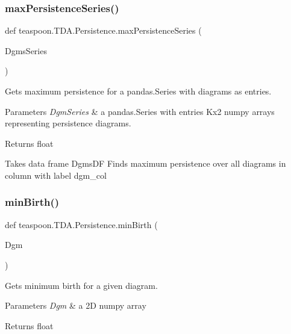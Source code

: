 \subsubsection{\texorpdfstring{max\+Persistence\+Series()}{maxPersistenceSeries()}}
{\footnotesize\ttfamily def teaspoon.\+T\+D\+A.\+Persistence.\+max\+Persistence\+Series (\begin{DoxyParamCaption}\item[{}]{Dgms\+Series }\end{DoxyParamCaption})}



Gets maximum persistence for a pandas.\+Series with diagrams as entries.


\begin{DoxyParams}{Parameters}
{\em Dgm\+Series} & a pandas.\+Series with entries Kx2 numpy arrays representing persistence diagrams.\\
\hline
\end{DoxyParams}
\begin{DoxyReturn}{Returns}
float \begin{DoxyVerb}Takes data frame DgmsDF
Finds maximum persistence over all diagrams in
column with label dgm_col
\end{DoxyVerb}

\end{DoxyReturn}
\mbox{\label{namespaceteaspoon_1_1_t_d_a_1_1_persistence_a4cb4a0b96d87e48f0d1170fd0252a9ae}}
\subsubsection{\texorpdfstring{min\+Birth()}{minBirth()}}
{\footnotesize\ttfamily def teaspoon.\+T\+D\+A.\+Persistence.\+min\+Birth (\begin{DoxyParamCaption}\item[{}]{Dgm }\end{DoxyParamCaption})}



Gets minimum birth for a given diagram.


\begin{DoxyParams}{Parameters}
{\em Dgm} & a 2D numpy array\\
\hline
\end{DoxyParams}
\begin{DoxyReturn}{Returns}
float
\end{DoxyReturn}
\mbox{\label{namespaceteaspoon_1_1_t_d_a_1_1_persistence_a1db04f6a997b34a930bc3e28d2cb709e}}
